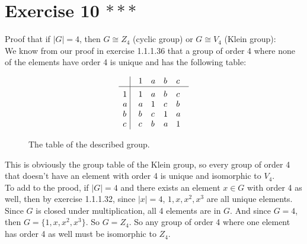 \documentclass{article}
\begin{document}
    \section*{Exercise 10 $***$}
    Proof that if $|G| = 4$, 
    then $G \cong Z_4$ (cyclic group) or $G \cong V_4$ (Klein group): \\
    We know from our proof in exercise 1.1.1.36 that a group
    of order 4 where none of the elements have order 4
    is unique and has the following table:
    \begin{figure}[H]
        \centering

        \[\vbox{\tabskip0.5em\offinterlineskip
        \halign{\strut$#$\hfil\ \tabskip1em\vrule&&$#$\hfil\cr
        ~   & 1   & a   & b & c \cr
        \noalign{\hrule}\vrule height 12pt width 0pt
        1   & 1 & a & b & c \cr 
        a   & a & 1 & c & b \cr 
        b   & b & c & 1 & a \cr 
        c   & c & b & a & 1 \cr
        }}\]

        \caption{\label{fig:figure1} The table of the described group.}
    \end{figure}
    
    This is obviously the group table of the Klein group,
    so every group of order 4 that doesn't have
    an element with order 4 is unique and isomorphic to $V_4$. \\
    To add to the prood, if $|G| = 4$ and there exists
    an element $x \in G$ with order 4 as well,
    then by exercise 1.1.1.32, since $|x| = 4$,
    $1, x, x^2, x^3$ are all unique elements.
    Since $G$ is closed under multiplication,
    all 4 elements are in $G$.
    And since $G = 4$, then $G = \{1, x, x^2, x^3\}$.
    So $G = Z_4$.
    So any group of order 4 where one element has order 4 as well
    must be isomorphic to $Z_4$.
\end{document}
